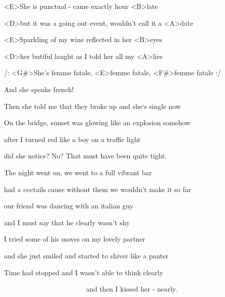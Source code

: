 

\zs
<E>She is punctual - came exactly hour <B>late

<D>but it was a going out event, wouldn't call it a <A>date

<E>Sparkling of my wine reflected in her <B>eyes

<D>her butiful laught as I told her all my <A>lies
\ks

\zr
/: <G#>She’s femme fatale, <E>femme fatale, <F#>femme fatale :/

And she speaks french!
\kr

\zs
Then she told me that they broke up and she‘s single now 

On the bridge, sunset was glowing like an explosion somehow

after I turned red like a boy on a traffic light

did she notice? No? That must have been quite tight.
\ks

\zr
\kr

\zs
The night went on, we went to a full vibrant bar

had a coctails cause without them we wouldn't make it so far

our friend was dancing with an italian guy

and I must say that he clearly wasn't shy
\ks

\zs
I tried some of his moves on my lovely partner

and she just smiled and started to shiver like a panter

Time had stopped and I wasn't able to think clearly

~~~~~~~~~~~~~~~~~~~~~~~ and then I kissed her - nearly.
\ks

\zr
\kr

\kp
